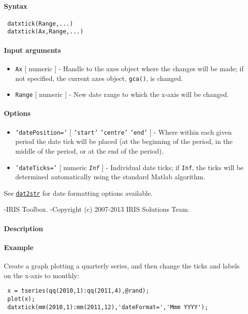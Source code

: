 


	\paragraph{Syntax}
 
 \begin{verbatim}
 datxtick(Range,...)
 datxtick(Ax,Range,...)
 \end{verbatim}
 
 \paragraph{Input arguments}
 
 \begin{itemize}
 \item
   \texttt{Ax} {[} numeric {]} - Handle to the axes object where the
   changes will be made; if not specified, the current axes object,
   \texttt{gca()}, is changed.
 \item
   \texttt{Range} {[} numeric {]} - New date range to which the x-axis
   will be changed.
 \end{itemize}
 
 \paragraph{Options}
 
 \begin{itemize}
 \item
   \texttt{'datePosition='} {[} \texttt{'start'} \textbar{}
   \texttt{'centre'} \textbar{} \texttt{'end'} {]} - Where within each
   given period the date tick will be placed (at the beginning of the
   period, in the middle of the period, or at the end of the period).
 \item
   \texttt{'dateTicks='} {[} numeric \textbar{} \emph{\texttt{Inf}} {]} -
   Individual date ticks; if \texttt{Inf}, the ticks will be determined
   automatically using the standard Matlab algorithm.
 \end{itemize}
 
 See \href{dates/dat2str}{\texttt{dat2str}} for date formatting options
 available.
 
 -IRIS Toolbox. -Copyright (c) 2007-2013 IRIS Solutions Team.
 
 \paragraph{Description}
 
 \paragraph{Example}
 
 Create a graph plotting a quarterly series, and then change the ticks
 and labels on the x-axis to monthly:
 
 \begin{verbatim}
 x = tseries(qq(2010,1):qq(2011,4),@rand);
 plot(x);
 datxtick(mm(2010,1):mm(2011,12),'dateFormat=','Mmm YYYY');
 \end{verbatim}


